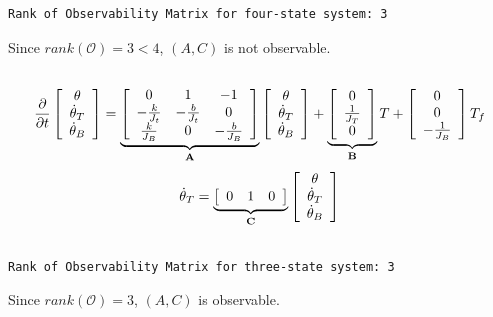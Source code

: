 \documentclass[12pt]{article}
\begin{document}
\subsection{}

\begin{Verbatim}
Rank of Observability Matrix for four-state system: 3
\end{Verbatim}
Since $rank(\mathcal{O})=3<4$, $(A,C)$ is not observable.
\subsection{}
\begin{equation}
\frac{\partial}{\partial t}\left[
\begin{array}{c}
\theta\\
\dot\theta_T\\
\dot\theta_B
\end{array}\right]=\underbrace{\left[
	\begin{array}{ccc}
	0&1&-1\\
	-\frac{k}{J_t}&-\frac{b}{J_t}&0\\
	\frac{k}{J_B}&0&-\frac{b}{J_B}
	\end{array}\right]}_\text{\textbf{A}}\left[
\begin{array}{c}
\theta\\
\dot\theta_T\\
\dot\theta_B
\end{array}\right]+\underbrace{\left[
	\begin{array}{c}
	0\\
	\frac{1}{J_T}\\
	0
	\end{array}
	\right]}_\text{\textbf{B}}T+\left[
\begin{array}{c}
0\\
0\\
-\frac{1}{J_B}
\end{array}
\right]T_f
\end{equation}
\begin{equation}
\dot\theta_T=\underbrace{\left[
	\begin{array}{cccc}
	0&1&0
	\end{array}
	\right]}_\text{\textbf{C}}\left[
\begin{array}{c}
\theta\\
\dot\theta_T\\
\dot\theta_B
\end{array}
\right]
\end{equation}
\subsection{}

\begin{Verbatim}
Rank of Observability Matrix for three-state system: 3
\end{Verbatim}
Since $rank(\mathcal{O})=3$, $(A,C)$ is observable.
\end{document}
